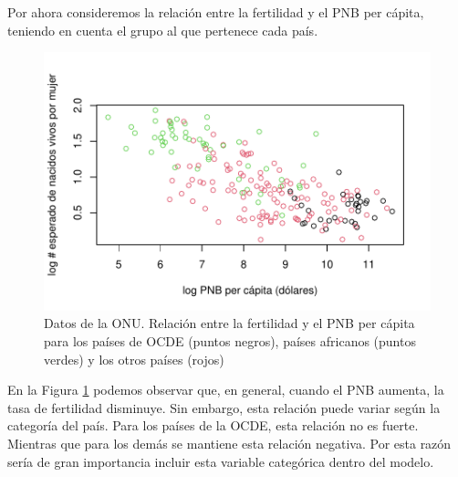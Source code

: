 \documentclass[
]{article}
\newenvironment{Shaded}{\begin{snugshade}}{\end{snugshade}}
\newcommand{\AttributeTok}[1]{\textcolor[rgb]{0.77,0.63,0.00}{#1}}
\newcommand{\FunctionTok}[1]{\textcolor[rgb]{0.00,0.00,0.00}{#1}}
\newcommand{\NormalTok}[1]{#1}
\newcommand{\SpecialCharTok}[1]{\textcolor[rgb]{0.00,0.00,0.00}{#1}}
\newcommand{\StringTok}[1]{\textcolor[rgb]{0.31,0.60,0.02}{#1}}
\begin{document}
Por ahora consideremos la relación entre la fertilidad y el PNB per cápita, teniendo en cuenta el grupo al que pertenece cada país.

\begin{Shaded}
\end{Shaded}

\begin{figure}

{\centering \includegraphics{MLG2_files/figure-latex/UN11Figure-1} 

}

\caption{Datos de la ONU. Relación entre la fertilidad y el PNB per cápita para los países de OCDE (puntos negros), países africanos (puntos verdes) y los otros países (rojos)}\label{fig:UN11Figure}
\end{figure}

En la Figura \ref{fig:UN11Figure} podemos observar que, en general, cuando el PNB aumenta, la tasa de fertilidad disminuye. Sin embargo, esta relación puede variar según la categoría del país. Para los países de la OCDE, esta relación no es fuerte. Mientras que para los demás se mantiene esta relación negativa. Por esta razón sería de gran importancia incluir esta variable categórica dentro del modelo.
\end{document}
